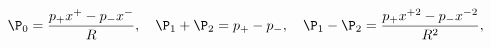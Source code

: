 \begin{equation}
\P_0=\frac{p_+x^+-p_-x^-}{R},\quad
\P_1+\P_2=p_+-p_-,\quad
\P_1-\P_2=\frac{p_+x^{+2}-p_-x^{-2}}{R^2},
\label{adspar}
\end{equation}

